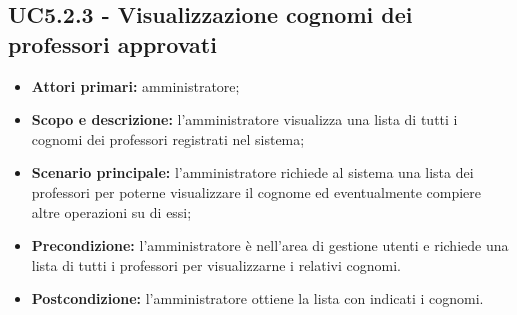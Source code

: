 \documentclass[AnalisiDeiRequisiti.tex]{subfiles}
\begin{document}
\subsection{UC5.2.3 - Visualizzazione cognomi dei professori approvati}
\begin{itemize}
	\item \textbf{Attori primari:} amministratore;
	\item \textbf{Scopo e descrizione:} l'amministratore visualizza una lista di tutti i cognomi dei professori registrati nel sistema;
	\item \textbf{Scenario principale:} l'amministratore richiede al sistema una lista dei professori per poterne visualizzare il cognome ed eventualmente compiere altre operazioni su di essi;
	\item \textbf{Precondizione:} l'amministratore è nell'area di gestione utenti e richiede una lista di tutti i professori per visualizzarne i relativi cognomi.
	\item \textbf{Postcondizione:} l'amministratore ottiene la lista con indicati i cognomi.
\end{itemize}
\end{document}
